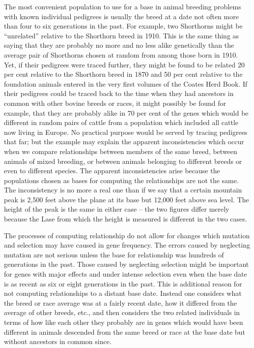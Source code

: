 The most convenient population to use for a base in animal breeding
problems with known individual pedigrees is usually the breed at a
date not often more than four to six generations in the past. For example,
two Shorthorns might be ``unrelated'' relative to the Shorthorn
breed in 1910. This is the same thing as saying that they are probably
no more and no less alike genetically than the average pair of Shorthorns
chosen at random from among those born in 1910. Yet, if their
pedigrees were traced further, they might be found to be related 20 per
cent relative to the Shorthorn breed in 1870 and 50 per cent relative to
the foundation animals entered in the very first volumes of the Coates
Herd Book. If their pedigrees could be traced back to the time when
they had ancestors in common with other bovine breeds or races, it
might possibly be found for example, that they are probably alike in 70
per cent of the genes which would be different in random pairs of cattle
from a population which included all cattle now living in Europe.
No practical purpose would be served by tracing pedigrees that far; but
the example may explain the apparent inconsistencies which occur
when we compare relationships between members of the same breed,
between animals of mixed breeding, or between animals belonging to
different breeds or even to different species. The apparent inconsistencies
arise because the populations chosen as bases for computing the
relationships are not the same. The inconsistency is no more a real one
than if we say that a certain mountain peak is 2,500 feet above the plane
at its base but 12,000 feet above sea level. The height of the peak is the
same in either case -- the two figures differ merely because the Lase from
which the height is measured is different in the two cases.

The processes of computing relationship do not allow for changes
which mutation and selection may have caused in gene frequency. The
errors caused by neglecting mutation are not serious unless the base for
relationship was hundreds of generations in the past. Those caused by
neglecting selection might be important for genes with major effects
and under intense selection even when the base date is as recent as six
or eight generations in the past. This is additional reason for not computing
relationships to a distant base date. Instead one considers what
the breed or race average was at a fairly recent date, how it differed
from the average of other breeds, etc., and then considers the two
related individuals in terms of how like each other they probably are in
genes which would have been different in animals descended from the
same breed or race at the base date but without ancestors in common
since.

